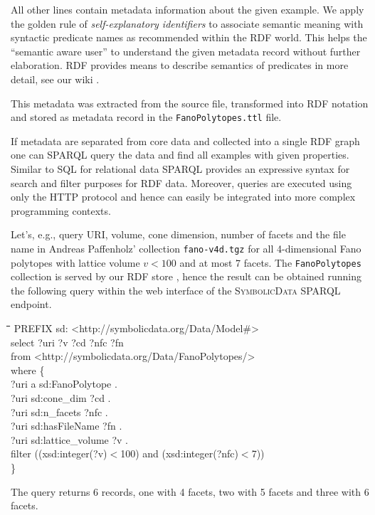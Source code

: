 \documentclass{mathincs}
\newcommand{\SD}{\textsc{Symbo\-lic\-Data}}
\newenvironment{code}{\par\tt\begin{tabbing}
\hskip12pt\=\hskip12pt\=\hskip12pt\=\hskip12pt\=\hskip5cm\=\hskip5cm\=\kill}
{\end{tabbing}\normalsize}
\begin{document}
All other lines contain metadata information about the given example.  We apply
the golden rule of \emph{self-explanatory identifiers} to associate semantic
meaning with syntactic predicate names as recommended within the RDF world.
This helps the ``semantic aware user'' to understand the given metadata record
without further elaboration. RDF provides means to describe semantics of
predicates in more detail, see our wiki \cite{sdwiki}.

This metadata was extracted from the source file, transformed into RDF notation
and stored as metadata record in the \texttt{FanoPolytopes.ttl} file.

If metadata are separated from core data and collected into a single RDF graph
one can SPARQL query \cite{sdsparql} the data and find all examples with given
properties.  Similar to SQL for relational data SPARQL provides an expressive
syntax for search and filter purposes for RDF data. Moreover, queries are
executed using only the HTTP protocol and hence can easily be integrated into
more complex programming contexts.

Let's, e.g., query URI, volume, cone dimension, number of facets and the file
name in Andreas Paffenholz' collection \texttt{fano-v4d.tgz} for all
4-dimensional Fano polytopes with lattice volume $v<100$ and at most 7 facets.
The \texttt{FanoPolytopes} collection is served by our RDF store
\cite{sdstore}, hence the result can be obtained running the following query
within the web interface \cite{sdsparql} of the {\SD} SPARQL endpoint.
\begin{code}
  PREFIX sd: <http://symbolicdata.org/Data/Model\#> \\
  select ?uri ?v ?cd ?nfc ?fn\\
  from <http://symbolicdata.org/Data/FanoPolytopes/>\\
  where \{\+\\
  ?uri a sd:FanoPolytope .\\
  ?uri sd:cone\_dim ?cd .\\
  ?uri sd:n\_facets ?nfc .\\
  ?uri sd:hasFileName ?fn . \\
  ?uri sd:lattice\_volume ?v . \\
  filter ((xsd:integer(?v)$<$100) and (xsd:integer(?nfc)$<$7))\-\\
  \}
\end{code}
The query returns 6 records, one with 4 facets, two with 5 facets and three
with 6 facets. 
\end{document}
